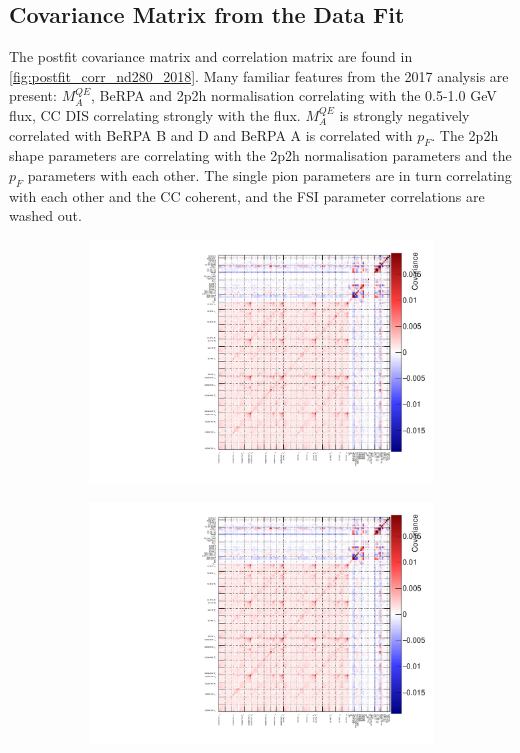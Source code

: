 \subsection{Covariance Matrix from the Data Fit}
The postfit covariance matrix and correlation matrix are found in \autoref{fig:postfit_corr_nd280_2018}. Many familiar features from the 2017 analysis are present: $M_A^{QE}$, BeRPA and 2p2h normalisation correlating with the 0.5-1.0 GeV flux, CC DIS correlating strongly with the flux. $M_A^{QE}$ is strongly negatively correlated with BeRPA B and D and BeRPA A is correlated with $p_F$. The 2p2h shape parameters are correlating with the 2p2h normalisation parameters and the $p_F$ parameters with each other. The single pion parameters are in turn correlating with each other and the CC coherent, and the FSI parameter correlations are washed out.
\begin{figure}[h]
		\begin{subfigure}[t]{0.49\textwidth}
			\includegraphics[width=\textwidth, trim={0mm 0mm 0mm 0mm}, clip,page=5]{figures/mach3/2018/data/2018a_FixedCov_RedCov_Mpi_Data_merge_drawCorr}
		\end{subfigure}
		\begin{subfigure}[t]{0.49\textwidth}
			\includegraphics[width=\textwidth, trim={0mm 0mm 0mm 0mm}, clip,page=6]{figures/mach3/2018/data/2018a_FixedCov_RedCov_Mpi_Data_merge_drawCorr}

\end{subfigure}
\end{figure}

